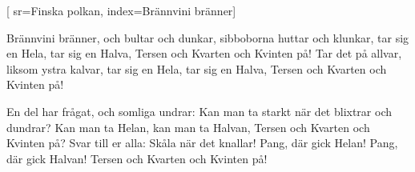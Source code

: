 [ 							
	sr={Finska polkan},					
	index={Brännvini bränner}]		
	
\beginverse*						
Brännvini bränner, och bultar och dunkar, 
sibboborna huttar och klunkar,
tar sig en Hela, 
tar sig en Halva, 
Tersen och Kvarten och Kvinten på!
Tar det på allvar,
liksom ystra kalvar,
tar sig en Hela, 
tar sig en Halva,
Tersen och Kvarten och Kvinten på!
\endverse						

\beginverse				
En del har frågat, och somliga undrar:
Kan man ta starkt när det blixtrar och dundrar?
Kan man ta Helan, 
kan man ta Halvan,
Tersen och Kvarten och Kvinten på?
Svar till er alla:
Skåla när det knallar!
Pang, där gick Helan!
Pang, där gick Halvan!
Tersen och Kvarten och Kvinten på!
\endverse				
\endsong		
